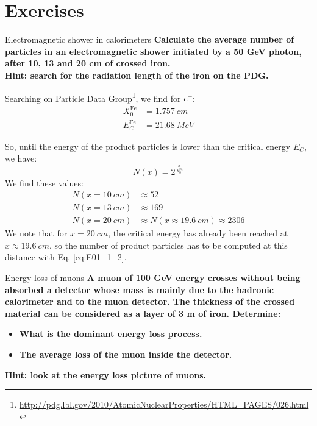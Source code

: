\documentclass[../../main/main.tex]{subfiles}
\begin{document}
\chapter{Exercises}

\begin{exercise}{Electromagnetic shower in calorimeters}{}
	\textbf{Calculate the average number of particles in an electromagnetic shower initiated by a 50 GeV photon, after 10, 13 and 20 cm of crossed iron.\\Hint: search for the radiation length of the iron on the PDG.}

	\medskip
	Searching on Particle Data Group\footnote{\url{http://pdg.lbl.gov/2010/AtomicNuclearProperties/HTML_PAGES/026.html}}, we find for \( e^- \):
	\begin{align}
		X_0^{\text{Fe}}	&=	1.757 \ \si{cm}	\\
		E_C^{\text{Fe}}	&=	21.68 \ \si{MeV}
		\label{eq:E01_1_1}
	\end{align}

	So, until the energy of the product particles is lower than the critical energy \( E_C \), we have:
	\begin{equation}
		N(x) = 2^{\frac{x}{X_0^{\text{Fe}}}}
		\label{eq:E01_1_2}
	\end{equation}
	We find these values:
	\begin{align}
		N(x = 10 \ \si{cm}) &\approx 52		\\
		N(x = 13 \ \si{cm}) &\approx 169	\\
		N(x = 20 \ \si{cm}) &\approx N(x \approx 19.6 \ \si{cm}) \approx 2306
	\end{align}
	We note that for \( x = 20 \ \si{cm} \), the critical energy has already been reached at \( x \approx 19.6 \ \si{cm} \), so the number of product particles has to be computed at this distance with Eq. \ref{eq:E01_1_2}.
\end{exercise}





\bigskip
\begin{exercise}{Energy loss of muons}{}
	\textbf{A muon of 100 GeV energy crosses without being absorbed a detector whose mass is mainly due to the hadronic calorimeter and to the muon detector. The thickness of the crossed material can be considered as a layer of 3 m of iron. Determine:}
	\begin{itemize}
		\item \textbf{What is the dominant energy loss process.}
		\item \textbf{The average loss of the muon inside the detector.}
	\end{itemize}
	\textbf{Hint: look at the energy loss picture of muons.}
\end{exercise}
\end{document}
